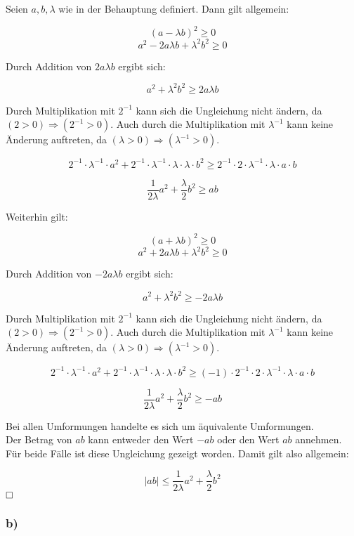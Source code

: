 \documentclass[11pt, a4paper]{article}
\begin{document}
		Seien $a,b,\lambda$ wie in der Behauptung definiert. Dann gilt allgemein:

		\[ (a-\lambda b)^2 \geq 0 \]
		\[ a^2 - 2a\lambda b + \lambda^2b^2 \geq 0 \]

		Durch Addition von $2a\lambda b$ ergibt sich:

		\[ a^2 + \lambda^2b^2 \geq 2a\lambda b \]

		Durch Multiplikation mit $2^{-1}$ kann sich die Ungleichung nicht ändern, da $(2 > 0) \Rightarrow (2^{-1} > 0)$.
		Auch durch die Multiplikation mit $\lambda^{-1}$ kann keine Änderung auftreten, da $(\lambda > 0) \Rightarrow (\lambda^{-1} > 0)$.

		\[2^{-1}\cdot \lambda^{-1}\cdot a^2 + 2^{-1}\cdot \lambda^{-1} \cdot \lambda \cdot \lambda \cdot b^2 \geq 2^{-1}\cdot 2 \cdot \lambda^{-1} \cdot \lambda \cdot a\cdot b \]

		\[ \dfrac{1}{2\lambda}a^2 + \dfrac{\lambda}{2}b^2 \geq ab \]

		Weiterhin gilt:

		\[ (a+\lambda b)^2 \geq 0 \]
		\[ a^2 + 2a\lambda b + \lambda^2b^2 \geq 0 \]

		Durch Addition von $-2a\lambda b$ ergibt sich:

		\[ a^2 + \lambda^2b^2 \geq -2a\lambda b \]

		Durch Multiplikation mit $2^{-1}$ kann sich die Ungleichung nicht ändern, da $(2 > 0) \Rightarrow (2^{-1} > 0)$.
		Auch durch die Multiplikation mit $\lambda^{-1}$ kann keine Änderung auftreten, da $(\lambda > 0) \Rightarrow (\lambda^{-1} > 0)$.

		\[2^{-1}\cdot \lambda^{-1}\cdot a^2 + 2^{-1} \cdot \lambda^{-1} \cdot \lambda \cdot \lambda \cdot b^2 \geq (-1) \cdot 2^{-1}\cdot 2 \cdot \lambda^{-1} \cdot \lambda \cdot a\cdot b \]

		\[ \dfrac{1}{2\lambda}a^2 + \dfrac{\lambda}{2}b^2 \geq -ab \]

		Bei allen Umformungen handelte es sich um äquivalente Umformungen.\\

		Der Betrag von $ab$ kann entweder den Wert $-ab$ oder den Wert $ab$ annehmen. Für beide Fälle ist diese Ungleichung gezeigt worden. Damit gilt also allgemein:

		\[|ab| \leq \dfrac{1}{2\lambda}a^2 + \dfrac{\lambda}{2}b^2 \]
		$\hfill\Box$


	\subsubsection*{b)}
\end{document}
